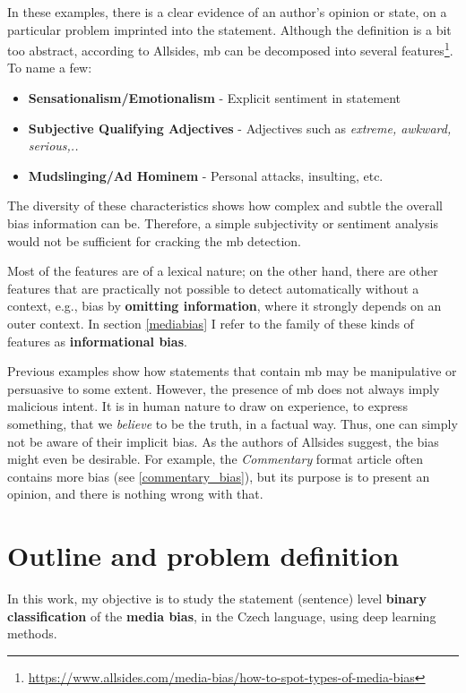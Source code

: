 In these examples, there is a clear evidence of an author's opinion or state, on a particular problem imprinted into the statement. Although the definition is a bit too abstract, according to Allsides, \gls{mb} can be decomposed into several features\footnote{\url{https://www.allsides.com/media-bias/how-to-spot-types-of-media-bias}}. To name a few:
\begin{itemize}\label{features}
    \item \textbf{Sensationalism/Emotionalism} - Explicit sentiment in statement
    \item \textbf{Subjective Qualifying Adjectives} - Adjectives such as \textit{extreme, awkward, serious,..}
    \item \textbf{Mudslinging/Ad Hominem} - Personal attacks, insulting, etc.
\end{itemize}

The diversity of these characteristics shows how complex and subtle the overall bias information can be. Therefore, a simple subjectivity or sentiment analysis would not be sufficient for cracking the \gls{mb} detection. 

Most of the features are of a lexical nature; on the other hand, there are other features that are practically not possible to detect automatically without a context, e.g., bias by \textbf{omitting information}, where it strongly depends on an outer context. In section \ref{mediabias} I refer to the family of these kinds of features as \textbf{informational bias}.


Previous examples show how statements that contain \gls{mb} may be manipulative or persuasive to some extent. However, the presence of \gls{mb} does not always imply malicious intent. It is in human nature to draw on experience, to express something, that we \textit{believe} to be the truth, in a factual way. Thus, one can simply not be aware of their implicit bias. As the authors of Allsides suggest, the bias might even be desirable. For example, the \textit{Commentary} format article often contains more bias (see \ref{commentary_bias}), but its purpose is to present an opinion, and there is nothing wrong with that.


\section{Outline and problem definition}\label{problem_definition}
In this work, my objective is to study the statement (sentence) level \textbf{binary classification} of the \textbf{media bias}, in the Czech language, using deep learning methods.

